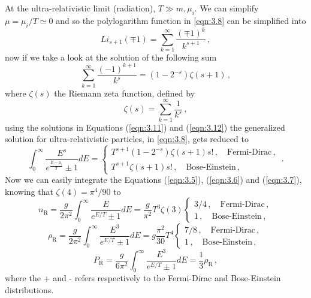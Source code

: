 At the ultra-relativistic limit (radiation), $T\gg m,\mu_i$. We can simplify $\mu=\mu_i/T \simeq 0$ and so the polylogarithm function in \autoref{eqn:3.8} can be simplified into
\begin{equation}
	\label{eqn:3.10}
	Li_{s+1}(\mp 1)=\sum\limits_{k=1}^{\infty}\frac{(\mp1)^k}{k^{s+1}}\,,
\end{equation}
now if we take a look at the solution of the following sum
\begin{equation}
	\label{eqn:3.11}
	\sum\limits_{k=1}^{\infty}\frac{(-1)^{k+1}}{k^s}=(1-2^{-s})\zeta(s+1)\,,
\end{equation}
where $\zeta(s)$ the Riemann zeta function, defined by
\begin{equation}
	\label{eqn:3.12}
	\zeta(s)=\sum\limits_{k=1}^{\infty}\frac{1}{k^s}\,,
\end{equation}
using the solutions in Equations (\ref{eqn:3.11}) and (\ref{eqn:3.12}) the generalized solution for ultra-relativistic particles, in \autoref{eqn:3.8}, gets reduced to 
\begin{equation}
	\int_{0}^{\infty}\frac{E^s}{e^{\frac{E-\mu_i}{T}}\pm 1}dE=\left\{ \begin{array}{c}
		T^{s+1}(1-2^{-s})\zeta(s+1)s!\,, \quad \textrm{Fermi-Dirac}\,, \\
		T^{s+1}\zeta(s+1)s!\,, \quad \textrm{Bose-Einstein}\,,	
	\end{array}\right.\,.
\end{equation}
Now we can easily integrate the Equations (\ref{eqn:3.5}), (\ref{eqn:3.6}) and (\ref{eqn:3.7}), knowing that $\zeta(4)=\pi^4/90$ to
\begin{equation}
	\label{eqn:3.14}
	n_{\textrm{R}}=\frac{g}{2\pi^2}\int_{0}^{\infty} \frac{E}{e^{E/T}\pm1}dE=\frac{g}{\pi^2}T^3\zeta(3)\left\{ \begin{array}{c}
		3/4\,, \quad \textrm{Fermi-Dirac}\,, \\
		1\,, \quad \textrm{Bose-Einstein}\,,
	\end{array}\right.
\end{equation}
\begin{equation}
	\label{eqn:3.15}
	\rho_{\textrm{R}}=\frac{g}{2\pi^2}\int_{0}^{\infty} \frac{E^3}{e^{E/T}\pm1}dE=g\frac{\pi^2}{30}T^4\left\{ \begin{array}{c}
		7/8\,,\quad \textrm{Fermi-Dirac}\,, \\
		1\,, \quad \textrm{Bose-Einstein}\,,
	\end{array}\right.
\end{equation} 
\begin{equation}
	\label{eqn:3.16}
	P_{\textrm{R}}=\frac{g}{6\pi^2}\int_{0}^{\infty} \frac{E^3}{e^{E/T}\pm1}dE=\frac{1}{3}\rho_{\textrm{R}}\,,
\end{equation}  
where the + and - refers respectively to the Fermi-Dirac and Bose-Einstein distributions.

